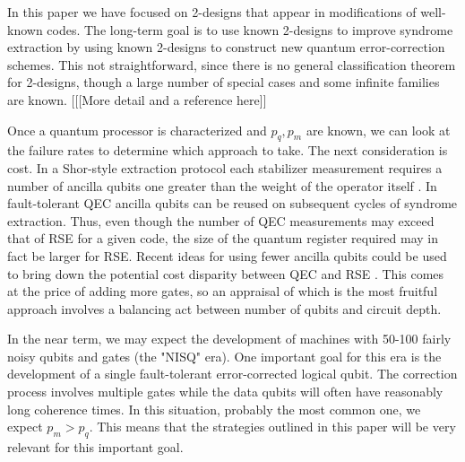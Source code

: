 \documentclass[reprint, superscriptaddress]{revtex4-1}
\numberwithin{equation}{section}
\numberwithin{figure}{section}
\numberwithin{table}{section}
\begin{document}
In this paper we have focused on 2-designs that appear in modifications of well-known codes.  The long-term goal is to use known 2-designs to improve syndrome extraction by using known 2-designs to construct new quantum error-correction schemes. This not straightforward, since there is no general classification theorem for 2-designs, though a large number of special cases and some infinite families are known. \cite{Rudolf1985} [[[More detail and a reference  here]]

Once a quantum processor is characterized and $p_q, p_m$ are known, we can look at the failure rates to determine which approach to take. The next consideration is cost. In a Shor-style extraction protocol each stabilizer measurement requires a number of ancilla qubits one greater than the weight of the operator itself \cite{Shor1996}. In fault-tolerant QEC ancilla qubits can be reused on subsequent cycles of syndrome extraction. Thus, even though the number of QEC measurements may exceed that of RSE for a given code, the size of the quantum register required may in fact be larger for RSE. Recent ideas for using fewer ancilla qubits could be used to bring down the potential cost disparity between QEC and RSE \cite{Chao2018}. This comes at the price of adding more gates, so an appraisal of which is the most fruitful approach involves a balancing act between number of qubits and circuit depth. 

In the near term, we may expect the development of machines with 50-100 fairly noisy qubits and gates (the "NISQ" era).  One important goal for this era is the development of a single fault-tolerant error-corrected logical qubit.  The correction process involves multiple gates while the data qubits will often have reasonably long coherence times.  In this situation, probably the most common one, we expect $p_m > p_q$.  This means that the strategies outlined in this paper will be very relevant for this important goal.        




\end{document}
